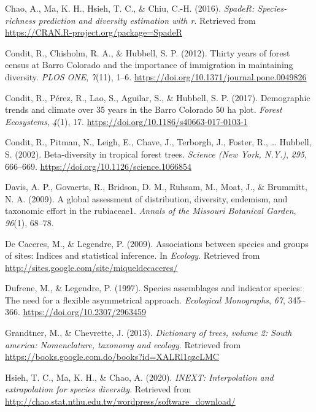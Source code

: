 \documentclass[11pt,]{article}
\begin{document}
\hypertarget{ref-spader_chao}{}
Chao, A., Ma, K. H., Hsieh, T. C., \& Chiu, C.-H. (2016). \emph{SpadeR:
Species-richness prediction and diversity estimation with r}. Retrieved
from \url{https://CRAN.R-project.org/package=SpadeR}

\hypertarget{ref-condit_et_al_2012}{}
Condit, R., Chisholm, R. A., \& Hubbell, S. P. (2012). Thirty years of
forest census at Barro Colorado and the importance of immigration in
maintaining diversity. \emph{PLOS ONE}, \emph{7}(11), 1--6.
\url{https://doi.org/10.1371/journal.pone.0049826}

\hypertarget{ref-condit_et_al_2017}{}
Condit, R., Pérez, R., Lao, S., Aguilar, S., \& Hubbell, S. P. (2017).
Demographic trends and climate over 35 years in the Barro Colorado 50 ha
plot. \emph{Forest Ecosystems}, \emph{4}(1), 17.
\url{https://doi.org/10.1186/s40663-017-0103-1}

\hypertarget{ref-article_condit}{}
Condit, R., Pitman, N., Leigh, E., Chave, J., Terborgh, J., Foster, R.,
\ldots{} Hubbell, S. (2002). Beta-diversity in tropical forest trees.
\emph{Science (New York, N.Y.)}, \emph{295}, 666--669.
\url{https://doi.org/10.1126/science.1066854}

\hypertarget{ref-davis2009global}{}
Davis, A. P., Govaerts, R., Bridson, D. M., Ruhsam, M., Moat, J., \&
Brummitt, N. A. (2009). A global assessment of distribution, diversity,
endemism, and taxonomic effort in the rubiaceae1. \emph{Annals of the
Missouri Botanical Garden}, \emph{96}(1), 68--78.

\hypertarget{ref-cita_indicspecies}{}
De Caceres, M., \& Legendre, P. (2009). Associations between species and
groups of sites: Indices and statistical inference. In \emph{Ecology}.
Retrieved from \url{http://sites.google.com/site/miqueldecaceres/}

\hypertarget{ref-dufrene_legendre}{}
Dufrene, M., \& Legendre, P. (1997). Species assemblages and indicator
species: The need for a flexible asymmetrical approach. \emph{Ecological
Monographs}, \emph{67}, 345--366. \url{https://doi.org/10.2307/2963459}

\hypertarget{ref-grandtner2013dictionary}{}
Grandtner, M., \& Chevrette, J. (2013). \emph{Dictionary of trees,
volume 2: South america: Nomenclature, taxonomy and ecology}. Retrieved
from \url{https://books.google.com.do/books?id=XALRl1qzcLMC}

\hypertarget{ref-inext_chao}{}
Hsieh, T. C., Ma, K. H., \& Chao, A. (2020). \emph{INEXT: Interpolation
and extrapolation for species diversity}. Retrieved from
\url{http://chao.stat.nthu.edu.tw/wordpress/software_download/}
\end{document}
